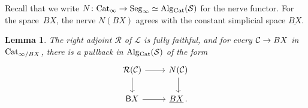 \documentclass[10pt]{amsart}
\numberwithin{equation}{section}
\newtheorem{lem}[prop]{Lemma}
\theoremstyle{definition}
\newcommand{\Cat}{\mathrm{Cat}\vphantom{t}}
\newcommand{\Alg}{\mathrm{Alg}\vphantom{z}}
\newcommand{\cC}{\mathcal{C}}
\newcommand{\cS}{\mathcal{S}}
\newcommand{\cL}{\mathcal{L}}
\newcommand{\cR}{\mathcal{R}}
\newcommand{\sfB}{\mathsf{B}}
\newcommand{\Seg}{\mathrm{Seg}_{\infty}}
\renewcommand{\to}{\mathchoice{\longrightarrow}{\rightarrow}{}{}}
\begin{document}
	Recall that we write $N\colon \Cat_{\infty} \to \Seg \simeq \Alg_{\Cat}(\cS)$ for the nerve functor. For the space~$BX$, the nerve $N(BX)$ agrees with the constant simplicial space $\underline{BX}$.

	\begin{lem}\label{lem:monoid_right_adjoint_1}
		The right adjoint $\cR$ of $\cL$ is fully faithful, and for every $\cC \to BX$ in $\Cat_{\infty /BX}$, there is a pullback in $\Alg_{\Cat}(\cS)$ of the form
		\begin{equation}\label{eq:monoid_right_adjoint_1}
			\begin{tikzcd}
				\cR(\cC) \arrow[r] \arrow[d]      &    N(\cC)  \arrow[d] \\
				\sfB X  \arrow[r]               &  \underline{BX} \, .
			\end{tikzcd}
		\end{equation}
	\end{lem}
\end{document}
